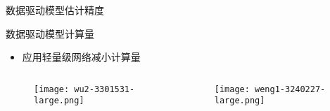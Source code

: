 \begin{frame}
\begin{columns}[t]
\begin{column}{0.5\textwidth}
\begin{block}{数据驱动模型估计精度}
{\begin{itemize}
					\end{itemize}			    
			    }
			\end{block}
			\begin{block}{数据驱动模型计算量}
			    {
			        \footnotesize
					\begin{itemize}
						\item 应用轻量级网络减小计算量
					\end{itemize}
				}
			\end{block}
		\end{column}
	\end{columns}
	\vspace{-0.2cm}
	\begin{columns}[b]
		\begin{column}{0.5\textwidth}
		   	\begin{figure}
				\texttt{[image: wu2-3301531-large.png]}
		   	\end{figure}
		\end{column}
		\begin{column}{0.5\textwidth}
		    \vspace{-0.5cm}
		   	\begin{figure}
				\texttt{[image: weng1-3240227-large.png]}
		   	\end{figure}
		\end{column}
	\end{columns}
\end{frame}
